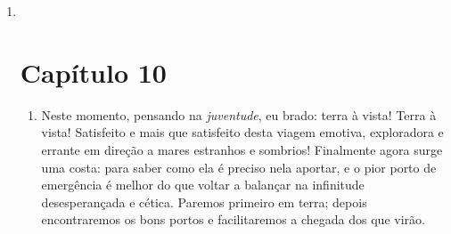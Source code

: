 \begin{enumerate}
\item ~
  \chapter{Capítulo 10}\label{capuxedtulo-10}

  \begin{enumerate}
  \item
    Neste momento, pensando na \emph{juventude}, eu brado: terra à
    vista! Terra à vista! Satisfeito e mais que satisfeito desta viagem
    emotiva, exploradora e errante em direção a mares estranhos e
    sombrios! Finalmente agora surge uma costa: para saber como ela é
    preciso nela aportar, e o pior porto de emergência é melhor do que
    voltar a balançar na infinitude desesperançada e cética. Paremos
    primeiro em terra; depois encontraremos os bons portos e
    facilitaremos a chegada dos que virão.


\end{enumerate}
\end{enumerate}

